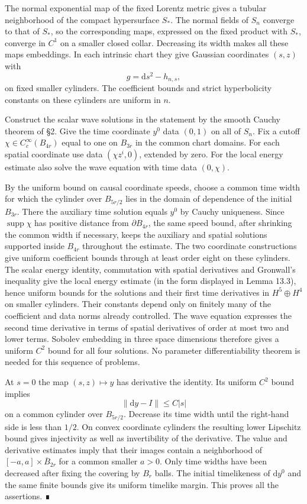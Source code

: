 \documentclass[
  english,
  11pt,
  reqno]{amsart}
\begin{document}
The normal exponential map of the fixed Lorentz metric gives a tubular
neighborhood of the compact hypersurface \(S_*\). The normal fields of
\(S_n\) converge to that of \(S_*\), so the corresponding maps,
expressed on the fixed product with \(S_*\), converge in \(C^1\) on a
smaller closed collar. Decreasing its width makes all these maps
embeddings. In each intrinsic chart they give Gaussian coordinates
\((s,z)\) with \[
g=\mathrm ds^2-h_{n,s},
\] on fixed smaller cylinders. The coefficient bounds and strict
hyperbolicity constants on these cylinders are uniform in \(n\).

Construct the scalar wave solutions in the statement by the smooth
Cauchy theorem of §2. Give the time coordinate \(y^0\) data \((0,1)\) on
all of \(S_n\). Fix a cutoff \(\chi\in C^\infty_c(B_{4r})\) equal to one
on \(B_{3r}\) in the common chart domains. For each spatial coordinate
use data \((\chi z^i,0)\), extended by zero. For the local energy
estimate also solve the wave equation with time data \((0,\chi)\).

By the uniform bound on causal coordinate speeds, choose a common time
width for which the cylinder over \(B_{5r/2}\) lies in the domain of
dependence of the initial \(B_{3r}\). There the auxiliary time solution
equals \(y^0\) by Cauchy uniqueness. Since \(\operatorname{supp}\chi\)
has positive distance from \(\partial B_{4r}\), the same speed bound,
after shrinking the common width if necessary, keeps the auxiliary and
spatial solutions supported inside \(B_{4r}\) throughout the estimate.
The two coordinate constructions give uniform coefficient bounds through
at least order eight on these cylinders. The scalar energy identity,
commutation with spatial derivatives and Gronwall's inequality give the
local energy estimate (in the form displayed in Lemma 13.3), hence
uniform bounds for the solutions and their first time derivatives in
\(H^5\oplus H^4\) on smaller cylinders. Their constants depend only on
finitely many of the coefficient and data norms already controlled. The
wave equation expresses the second time derivative in terms of spatial
derivatives of order at most two and lower terms. Sobolev embedding in
three space dimensions therefore gives a uniform \(C^2\) bound for all
four solutions. No parameter differentiability theorem is needed for
this sequence of problems.

At \(s=0\) the map \((s,z)\mapsto y\) has derivative the identity. Its
uniform \(C^2\) bound implies \[
\|\mathrm dy-I\|\le C|s|
\] on a common cylinder over \(B_{5r/2}\). Decrease its time width until
the right-hand side is less than \(1/2\). On convex coordinate cylinders
the resulting lower Lipschitz bound gives injectivity as well as
invertibility of the derivative. The value and derivative estimates
imply that their images contain a neighborhood of
\([-a,a]\times\overline B_{2r}\) for a common smaller \(a>0\). Only time
widths have been decreased after fixing the covering by \(B_r\) balls.
The initial timelikeness of \(\mathrm dy^0\) and the same finite bounds
give its uniform timelike margin. This proves all the assertions. ∎
\end{document}
